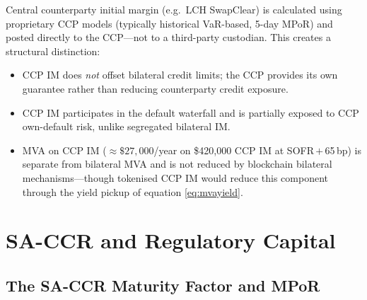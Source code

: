 \documentclass[12pt,letterpaper]{article}
\numberwithin{equation}{section}
\theoremstyle{remark}
\begin{document}
Central counterparty initial margin (e.g.\ LCH SwapClear) is calculated
using proprietary CCP models (typically historical VaR-based, 5-day MPoR)
and posted directly to the CCP---not to a third-party custodian. This
creates a structural distinction:

\begin{itemize}[leftmargin=2em,itemsep=3pt]
  \item CCP IM does \emph{not} offset bilateral credit limits; the CCP
    provides its own guarantee rather than reducing counterparty credit
    exposure.
  \item CCP IM participates in the default waterfall and is partially
    exposed to CCP own-default risk, unlike segregated bilateral IM.
  \item MVA on CCP IM ($\approx \$27{,}000$/year on \$420,000 CCP IM at
    SOFR\,$+$\,65\,bp) is separate from bilateral MVA and is not reduced
    by blockchain bilateral mechanisms---though tokenised CCP IM would
    reduce this component through the yield pickup of equation
    \eqref{eq:mvayield}.
\end{itemize}

\section{SA-CCR and Regulatory Capital}
\label{sec:saccr}

\subsection{The SA-CCR Maturity Factor and MPoR}
\end{document}
